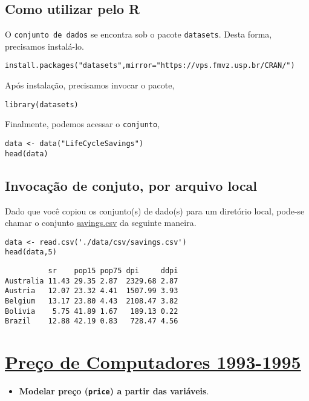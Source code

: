 \documentclass[12pt]{abntex2}
\begin{document}
\subsection{Como utilizar pelo R}
\label{sec:org0dc5e41}
O \texttt{conjunto de dados} se encontra sob o pacote \texttt{datasets}. Desta forma, precisamos
instalá-lo.

\begin{verbatim}
install.packages("datasets",mirror="https://vps.fmvz.usp.br/CRAN/")
\end{verbatim}

Após instalação, precisamos invocar o pacote,
\begin{verbatim}
library(datasets)
\end{verbatim}

Finalmente, podemos acessar o \texttt{conjunto},
\begin{verbatim}
data <- data("LifeCycleSavings")
head(data)
\end{verbatim}
\subsection{Invocação de conjuto, por arquivo local}
\label{sec:org2896cb9}

Dado que você copiou os conjunto(s) de dado(s) para um diretório
local, pode-se chamar o conjunto \href{https://drive.google.com/file/d/1j2K7J1rb3V2Qr\_t0rcBhA6tyuqh88AjY/view?usp=sharing}{savings.csv} da seguinte maneira.

\begin{verbatim}
data <- read.csv('./data/csv/savings.csv')
head(data,5)
\end{verbatim}

\begin{verbatim}
          sr    pop15 pop75 dpi     ddpi
Australia 11.43 29.35 2.87  2329.68 2.87
Austria   12.07 23.32 4.41  1507.99 3.93
Belgium   13.17 23.80 4.43  2108.47 3.82
Bolivia    5.75 41.89 1.67   189.13 0.22
Brazil    12.88 42.19 0.83   728.47 4.56
\end{verbatim}

\section{\href{https://r-data.pmagunia.com/dataset/r-dataset-package-ecdat-computers}{Preço de Computadores 1993-1995}}
\label{sec:orgde96e65}
\begin{itemize}
\item \textbf{Modelar preço (\texttt{price}) a partir das variáveis}.
\end{itemize}
\end{document}
